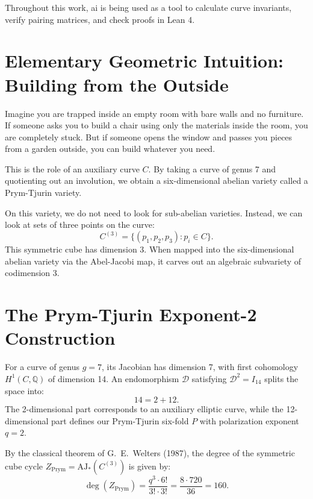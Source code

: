 \documentclass[11pt,a4paper]{article}
\theoremstyle{definition}
\begin{document}
Throughout this work, ai is being used as a tool to calculate curve invariants, verify pairing matrices, and check proofs in Lean 4.

\section{Elementary Geometric Intuition: Building from the Outside}

Imagine you are trapped inside an empty room with bare walls and no furniture. If someone asks you to build a chair using only the materials inside the room, you are completely stuck. But if someone opens the window and passes you pieces from a garden outside, you can build whatever you need.

This is the role of an auxiliary curve $C$. By taking a curve of genus 7 and quotienting out an involution, we obtain a six-dimensional abelian variety called a Prym-Tjurin variety. 

On this variety, we do not need to look for sub-abelian varieties. Instead, we can look at sets of three points on the curve:
\begin{equation}
C^{(3)} = \{(p_1, p_2, p_3) : p_i \in C\}.
\end{equation}
This symmetric cube has dimension 3. When mapped into the six-dimensional abelian variety via the Abel-Jacobi map, it carves out an algebraic subvariety of codimension 3.

\section{The Prym-Tjurin Exponent-2 Construction}

For a curve of genus $g = 7$, its Jacobian has dimension 7, with first cohomology $H^1(C, \mathbb{Q})$ of dimension 14. An endomorphism $\mathcal{D}$ satisfying $\mathcal{D}^2 = I_{14}$ splits the space into:
\begin{equation}
14 = 2 + 12.
\end{equation}
The 2-dimensional part corresponds to an auxiliary elliptic curve, while the 12-dimensional part defines our Prym-Tjurin six-fold $P$ with polarization exponent $q = 2$.

By the classical theorem of G.~E.~Welters (1987), the degree of the symmetric cube cycle $Z_{\text{Prym}} = \text{AJ}_*(C^{(3)})$ is given by:
\begin{equation}
\deg(Z_{\text{Prym}}) = \frac{q^3 \cdot 6!}{3! \cdot 3!} = \frac{8 \cdot 720}{36} = 160.
\end{equation}
\end{document}
